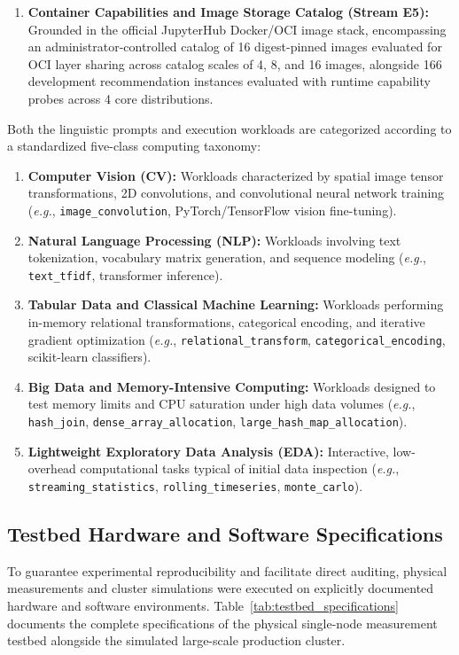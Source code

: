 \begin{enumerate}
    \item \textbf{Container Capabilities and Image Storage Catalog (Stream E5):} Grounded in the official JupyterHub Docker/OCI image stack, encompassing an administrator-controlled catalog of 16 digest-pinned images evaluated for OCI layer sharing across catalog scales of 4, 8, and 16 images, alongside 166 development recommendation instances evaluated with runtime capability probes across 4 core distributions.
\end{enumerate}

Both the linguistic prompts and execution workloads are categorized according to a standardized five-class computing taxonomy:
\begin{enumerate}
    \item \textbf{Computer Vision (CV):} Workloads characterized by spatial image tensor transformations, 2D convolutions, and convolutional neural network training (\textit{e.g.}, \texttt{image\_convolution}, PyTorch/TensorFlow vision fine-tuning).
    \item \textbf{Natural Language Processing (NLP):} Workloads involving text tokenization, vocabulary matrix generation, and sequence modeling (\textit{e.g.}, \texttt{text\_tfidf}, transformer inference).
    \item \textbf{Tabular Data and Classical Machine Learning:} Workloads performing in-memory relational transformations, categorical encoding, and iterative gradient optimization (\textit{e.g.}, \texttt{relational\_transform}, \texttt{categorical\_encoding}, scikit-learn classifiers).
    \item \textbf{Big Data and Memory-Intensive Computing:} Workloads designed to test memory limits and CPU saturation under high data volumes (\textit{e.g.}, \texttt{hash\_join}, \texttt{dense\_array\_allocation}, \texttt{large\_hash\_map\_allocation}).
    \item \textbf{Lightweight Exploratory Data Analysis (EDA):} Interactive, low-overhead computational tasks typical of initial data inspection (\textit{e.g.}, \texttt{streaming\_statistics}, \texttt{rolling\_timeseries}, \texttt{monte\_carlo}).
\end{enumerate}

\subsection{Testbed Hardware and Software Specifications}
\label{subsec:testbed_specs}

To guarantee experimental reproducibility and facilitate direct auditing, physical measurements and cluster simulations were executed on explicitly documented hardware and software environments. Table~\ref{tab:testbed_specifications} documents the complete specifications of the physical single-node measurement testbed alongside the simulated large-scale production cluster.

